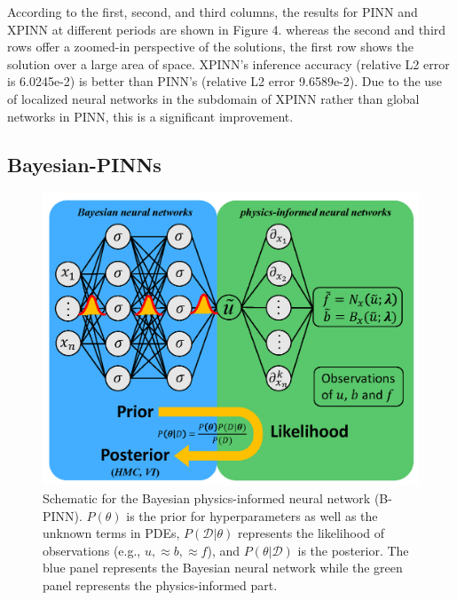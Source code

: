 \documentclass[conference,compsoc]{IEEEtran}
\begin{document}
According to the first, second, and third columns, the results for PINN and XPINN at different periods are shown in Figure 4\cite{jagtap2020extended}. whereas the second and third rows offer a zoomed-in perspective of the solutions, the first row shows the solution over a large area of space. XPINN's inference accuracy (relative L2 error is 6.0245e-2) is better than PINN's (relative L2 error 9.6589e-2)\cite{jagtap2020extended}. Due to the use of localized neural networks in the subdomain of XPINN rather than global networks in PINN, this is a significant improvement\cite{jagtap2020conservative}\cite{jagtap2020extended}.



\subsection{Bayesian-PINNs}


\begin{figure}[h]
    \centering
    \includegraphics[scale=0.5]{figures/B-PINNs.png}
    \caption{Schematic for the Bayesian physics-informed neural network (B-PINN). $P(\theta)$ is the prior for hyperparameters as well as the unknown terms in  PDEs, $P\left(\mathcal{D}|\theta \right)$ represents the likelihood of observations (e.g., $u,\approx b, \approx f$), and $P(\theta|\mathcal{D})$ is the posterior. The blue panel represents the Bayesian neural network while the green panel represents the physics-informed part. \cite{yang2021b}}
    \label{fig:B-PINNs}
\end{figure}
\end{document}
